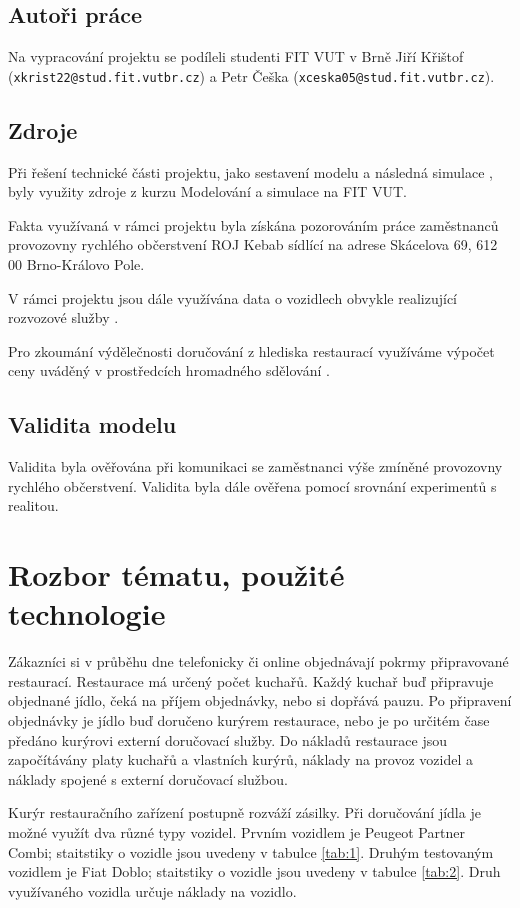 \documentclass[a4paper, 11pt]{article}
\begin{document}
\subsection{Autoři práce}
Na vypracování projektu se podíleli studenti FIT VUT v Brně Jiří Křištof (\texttt{xkrist22@stud.fit.vutbr.cz}) a Petr Češka (\texttt{xceska05@stud.fit.vutbr.cz}). 

\subsection{Zdroje}
Při řešení technické části projektu, jako sestavení modelu \cite[snímek 7]{IMS_course} a následná simulace \cite[snímek 8]{IMS_course}, byly využity zdroje z kurzu Modelování a simulace na FIT VUT. 

Fakta využívaná v rámci projektu byla získána pozorováním práce zaměstnanců provozovny rychlého občerstvení ROJ Kebab sídlící na adrese Skácelova 69, 612 00 Brno-Královo Pole.

V rámci projektu jsou dále využívána data o vozidlech obvykle realizující rozvozové služby \cite{car_peugeot, car_fiat}.

Pro zkoumání výdělečnosti doručování z hlediska restaurací využíváme výpočet ceny uváděný v prostředcích hromadného sdělování \cite{news}.

\subsection{Validita modelu}
Validita \cite[snímek 37]{IMS_course} byla ověřována při komunikaci se zaměstnanci výše zmíněné provozovny rychlého občerstvení. Validita byla dále ověřena pomocí srovnání experimentů \cite[snímek 9]{IMS_course} s realitou.

\section{Rozbor tématu, použité technologie}
Zákazníci si v průběhu dne telefonicky či online objednávají pokrmy připravované restaurací. Restaurace má určený počet kuchařů. Každý kuchař buď připravuje objednané jídlo, čeká na příjem objednávky, nebo si dopřává pauzu. Po připravení objednávky je jídlo buď doručeno kurýrem restaurace, nebo je po určitém čase předáno kurýrovi externí doručovací služby. Do nákladů restaurace jsou započítávány platy kuchařů a vlastních kurýrů, náklady na provoz vozidel a náklady spojené s externí doručovací službou.

Kurýr restauračního zařízení postupně rozváží zásilky. Při doručování jídla je možné využít dva různé typy vozidel. Prvním vozidlem je Peugeot Partner Combi; staitstiky o vozidle jsou uvedeny v tabulce \ref{tab:1}. Druhým testovaným vozidlem je Fiat Doblo; staitstiky o vozidle jsou uvedeny v tabulce \ref{tab:2}. Druh využívaného vozidla určuje náklady na vozidlo.
\end{document}
